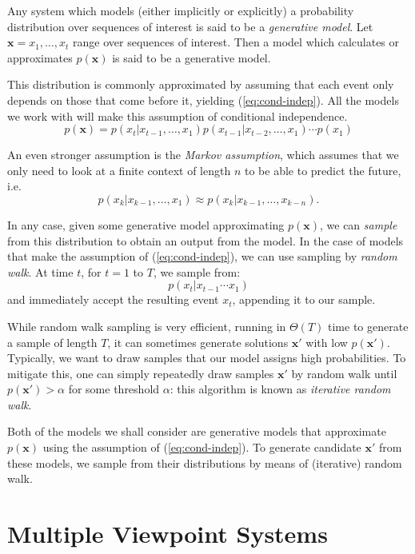 \documentclass[12pt,a4paper,twoside,openright]{report}
\newcommand{\vect}[1]{\boldsymbol{\mathbf{#1}}}
\begin{document}
Any system which models (either implicitly or explicitly)
a probability distribution over sequences of interest is said to be a
\emph{generative model}. Let $\vect{x} = x_1, \ldots, x_t$ range over sequences
of interest. Then a model which calculates or approximates $p(\vect{x})$ is said
to be a generative model.

This distribution is commonly approximated by assuming that each event only
depends on those that come before it, yielding (\ref{eq:cond-indep}).  All the
models we work with will make this assumption of conditional independence.
\begin{equation}
  p(\vect{x}) = p(x_t | x_{t-1}, \ldots, x_1) p(x_{t-1} | x_{t-2},
  \ldots, x_1) \cdots p(x_1) \label{eq:cond-indep}
\end{equation} 

An even stronger assumption is the \emph{Markov assumption}, which assumes that
we only need to look at a finite context of length $n$ to be able to predict the
future, i.e.
$$ p(x_k | x_{k-1}, \ldots, x_1) \approx p(x_k | x_{k-1}, \ldots, x_{k-n}). $$

In any case, given some generative model approximating $p(\vect{x})$, we can
\emph{sample} from this distribution to obtain an output from the model. In the
case of models that make the assumption of (\ref{eq:cond-indep}), we can use
sampling by \emph{random walk}. At time $t$, for $t = 1$ to $T$, we sample from:
$$ p(x_t | x_{t-1} \cdots x_1) $$
and immediately accept the resulting event $x_t$, appending it to our sample.

While random walk sampling is very efficient, running in $\Theta(T)$ time to
generate a sample of length $T$, it can sometimes generate solutions $\vect{x}'$
with low $p(\vect{x}')$. Typically, we want to draw samples that our model
assigns high probabilities. To mitigate this, one can simply repeatedly draw
samples $\vect{x}'$ by random walk until $p(\vect{x}') > \alpha$ for some
threshold $\alpha$: this algorithm is known as \emph{iterative random walk}.

Both of the models we shall consider are generative models that approximate
$p(\vect{x})$ using the assumption of (\ref{eq:cond-indep}). To generate
candidate $\vect{x}'$ from these models, we sample from their distributions by
means of (iterative) random walk.

\section{Multiple Viewpoint Systems}
\end{document}
